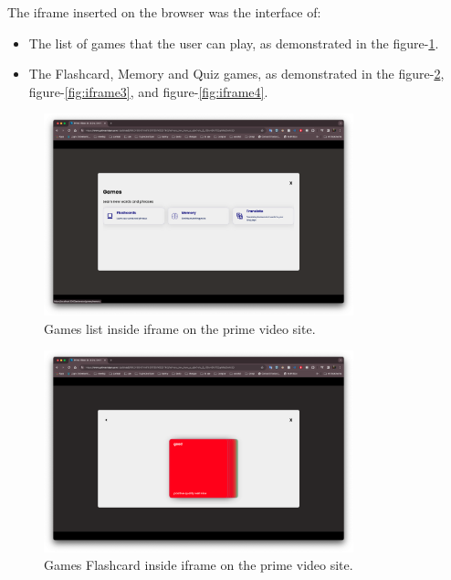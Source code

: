 \documentclass[12pt]{article}
\begin{document}
    The iframe inserted on the browser was the interface of:

    \begin{itemize}
    \item The list of games that the user can play, as demonstrated in the figure-\ref{fig:iframe1}.
    \item The Flashcard, Memory and Quiz games, as demonstrated in the figure-\ref{fig:iframe2}, figure-\ref{fig:iframe3}, and figure-\ref{fig:iframe4}.
    \end{itemize}


    \begin{figure}[h]
      \centering
      \caption{
      Games list inside iframe on the prime video site.
      }
      \label{fig:iframe1}
      \includegraphics[width=0.8\textwidth]{assets/9.png}
    \end{figure}

    \begin{figure}[h]
      \centering
      \caption{
      Games Flashcard inside iframe on the prime video site.
      }
      \label{fig:iframe2}
      \includegraphics[width=0.8\textwidth]{assets/10.png}
    \end{figure}
\end{document}
